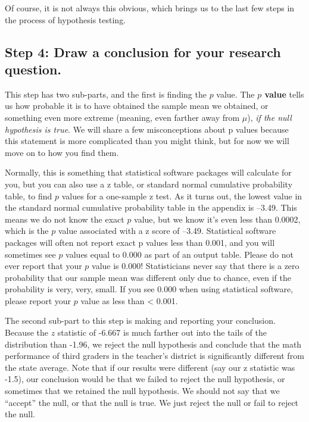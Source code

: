 \documentclass[
  letterpaper,
  DIV=11,
  numbers=noendperiod]{scrreprt}
\begin{document}
Of course, it is not always this obvious, which brings us to the last
few steps in the process of hypothesis testing.

\subsection*{Step 4: Draw a conclusion for your research
question.}\label{step-4-draw-a-conclusion-for-your-research-question.}

This step has two sub-parts, and the first is finding the \(p\) value.
The \textbf{\(p\) value} tells us how probable it is to have obtained
the sample mean we obtained, or something even more extreme (meaning,
even farther away from \(\mu\)), \emph{if the null hypothesis is true}.
We will share a few misconceptions about p values because this statement
is more complicated than you might think, but for now we will move on to
how you find them.

Normally, this is something that statistical software packages will
calculate for you, but you can also use a z table, or standard normal
cumulative probability table, to find \(p\) values for a one-sample z
test. As it turns out, the lowest value in the standard normal
cumulative probability table in the appendix is --3.49. This means we do
not know the exact \(p\) value, but we know it's even less than 0.0002,
which is the \(p\) value associated with a z score of --3.49.
Statistical software packages will often not report exact p values less
than 0.001, and you will sometimes see \(p\) values equal to 0.000 as
part of an output table. Please do not ever report that your \(p\) value
is 0.000! Statisticians never say that there is a zero probability that
our sample mean was different only due to chance, even if the
probability is very, very, small. If you see 0.000 when using
statistical software, please report your \(p\) value as less than
\textless{} 0.001.

The second sub-part to this step is making and reporting your
conclusion. Because the \(z\) statistic of -6.667 is much farther out
into the tails of the distribution than -1.96, we reject the null
hypothesis and conclude that the math performance of third graders in
the teacher's district is significantly different from the state
average. Note that if our results were different (say our z statistic
was -1.5), our conclusion would be that we failed to reject the null
hypothesis, or sometimes that we retained the null hypothesis. We should
not say that we ``accept'' the null, or that the null is true. We just
reject the null or fail to reject the null.
\end{document}
